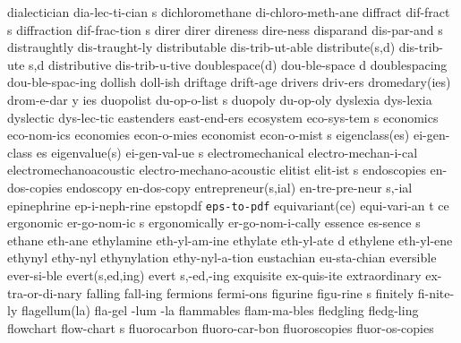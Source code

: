\5 dialectician		dia-lec-ti-cian s	%
\1 dichloromethane	di-chloro-meth-ane	%
\5 diffract		dif-fract s
\5 diffraction		dif-frac-tion s		%
\1 direr		direr
\1 direness		dire-ness
\5 disparand		dis-par-and s
\1 distraughtly		dis-traught-ly
\NewWordtrue
\1 distributable	dis-trib-ut-able	%
\2 distribute(s,d)	dis-trib-ute s,d
\NewWordtrue
\1 distributive 	dis-trib-u-tive 	%
\2 doublespace(d)	dou-ble-space d
\1 doublespacing	dou-ble-spac-ing
\1 dollish		doll-ish
\1 driftage		drift-age
\1 drivers		driv-ers             %
\3 dromedary(ies)	drom-e-dar y ies
\5 duopolist		du-op-o-list s
\1 duopoly		du-op-oly
\1 dyslexia		dys-lexia		%
\1 dyslectic		dys-lec-tic		%
\1 eastenders		east-end-ers
\NewWordtrue
\5 ecosystem		eco-sys-tem s		%
\1 economics		eco-nom-ics
\NewWordtrue
\1 economies		econ-o-mies		%
\5 economist		econ-o-mist s
\2 eigenclass(es)	ei-gen-class es		%
\2 eigenvalue(s)	ei-gen-val-ue s		%
\1 electromechanical	electro-mechan-i-cal
\1 electromechanoacoustic  electro-mechano-acoustic
\5 elitist		elit-ist s
\NewWordtrue
\1 endoscopies		en-dos-copies		%
\NewWordtrue
\1 endoscopy		en-dos-copy		%
\2 entrepreneur(s,ial)	en-tre-pre-neur s,-ial
\1 epinephrine		ep-i-neph-rine
\1 epstopdf		{\tt eps-to-pdf}	%
\3 equivariant(ce)	equi-vari-an t ce
\5 ergonomic		er-go-nom-ic s		%
\1 ergonomically	er-go-nom-i-cally	%
\5 essence		es-sence s		%
\1 ethane		eth-ane			%
\1 ethylamine		eth-yl-am-ine		%
\5 ethylate		eth-yl-ate d		%
\1 ethylene		eth-yl-ene
\1 ethynyl		ethy-nyl		%
\1 ethynylation		ethy-nyl-a-tion		%
\NewWordtrue
\1 eustachian		eu-sta-chian		%
\1 eversible		ever-si-ble
\2 evert(s,ed,ing)	evert s,-ed,-ing
\1 exquisite		ex-quis-ite
\1 extraordinary	ex-tra-or-di-nary
\1 falling		fall-ing		%
\1 fermions		fermi-ons
\5 figurine		figu-rine s		%
\1 finitely		fi-nite-ly		%
\3 flagellum(la)	fla-gel -lum -la
\1 flammables		flam-ma-bles
\1 fledgling		fledg-ling
\5 flowchart		flow-chart s
\1 fluorocarbon		fluoro-car-bon		%
\NewWordtrue
\1 fluoroscopies	fluor-os-copies 	%
